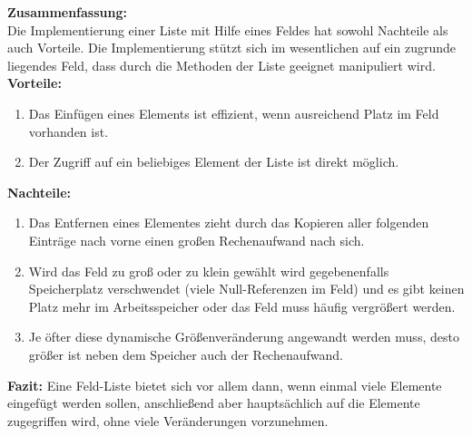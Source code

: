 \documentclass{article}
\begin{document}
\vspace{2cm}

\textbf{Zusammenfassung:} \\
Die Implementierung einer Liste mit Hilfe eines Feldes hat sowohl Nachteile als auch Vorteile. Die Implementierung stützt sich im wesentlichen auf ein zugrunde liegendes Feld, dass durch die Methoden der Liste geeignet manipuliert wird. \\
\textbf{Vorteile:}
\begin{enumerate}
    \item Das Einfügen eines Elements ist effizient, wenn ausreichend Platz im Feld vorhanden ist.
    \item Der Zugriff auf ein beliebiges Element der Liste ist direkt möglich. 
\end{enumerate}
\textbf{Nachteile:}
\begin{enumerate}
    \item Das Entfernen eines Elementes zieht durch das Kopieren aller folgenden Einträge nach vorne einen großen Rechenaufwand nach sich. 
    \item Wird das Feld zu groß oder zu klein gewählt wird gegebenenfalls Speicherplatz verschwendet (viele Null-Referenzen im Feld) und es gibt keinen Platz mehr im Arbeitsspeicher oder das Feld muss häufig vergrößert werden. 
    \item Je öfter diese dynamische Größenveränderung angewandt werden muss, desto größer ist neben dem Speicher auch der Rechenaufwand.
\end{enumerate}

\textbf{Fazit:} Eine Feld-Liste bietet sich vor allem dann, wenn einmal viele Elemente eingefügt werden sollen, anschließend aber hauptsächlich auf die Elemente zugegriffen wird, ohne viele Veränderungen vorzunehmen. 
\end{document}
